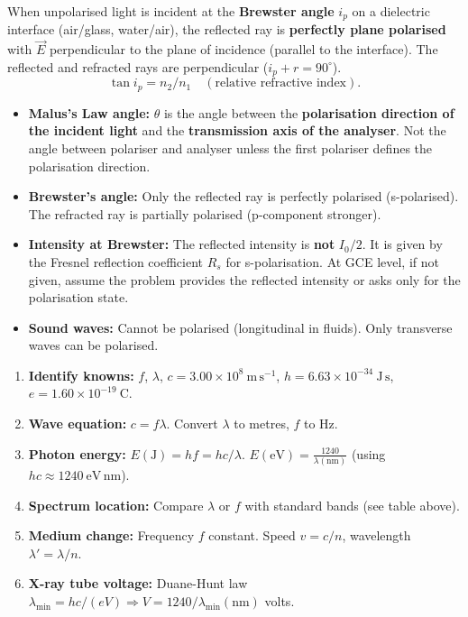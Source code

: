 \documentclass[11pt]{article}
\begin{document}
\begin{propriete}
When unpolarised light is incident at the \textbf{Brewster angle} $i_p$ on a dielectric interface (air/glass, water/air), the reflected ray is \textbf{perfectly plane polarised} with $\vec{E}$ perpendicular to the plane of incidence (parallel to the interface). The reflected and refracted rays are perpendicular ($i_p + r = 90^\circ$).
\[
\tan i_p = n_2/n_1 \quad (\text{relative refractive index}).
\]
\end{propriete}

\begin{attention}
\begin{itemize}
\item \textbf{Malus's Law angle:} $\theta$ is the angle between the \textbf{polarisation direction of the incident light} and the \textbf{transmission axis of the analyser}. Not the angle between polariser and analyser unless the first polariser defines the polarisation direction.
\item \textbf{Brewster's angle:} Only the reflected ray is perfectly polarised (s-polarised). The refracted ray is partially polarised (p-component stronger).
\item \textbf{Intensity at Brewster:} The reflected intensity is \textbf{not} $I_0/2$. It is given by the Fresnel reflection coefficient $R_s$ for s-polarisation. At GCE level, if not given, assume the problem provides the reflected intensity or asks only for the polarisation state.
\item \textbf{Sound waves:} Cannot be polarised (longitudinal in fluids). Only transverse waves can be polarised.
\end{itemize}
\end{attention}

\begin{methode}
\begin{enumerate}
\item \textbf{Identify knowns:} $f$, $\lambda$, $c = 3.00 \times 10^8\ \mathrm{m\,s^{-1}}$, $h = 6.63 \times 10^{-34}\ \mathrm{J\,s}$, $e = 1.60 \times 10^{-19}\ \mathrm{C}$.
\item \textbf{Wave equation:} $c = f\lambda$. Convert $\lambda$ to metres, $f$ to Hz.
\item \textbf{Photon energy:} $E(\mathrm{J}) = hf = hc/\lambda$. $E(\mathrm{eV}) = \frac{1240}{\lambda(\mathrm{nm})}$ (using $hc \approx 1240\ \mathrm{eV\,nm}$).
\item \textbf{Spectrum location:} Compare $\lambda$ or $f$ with standard bands (see table above).
\item \textbf{Medium change:} Frequency $f$ constant. Speed $v = c/n$, wavelength $\lambda' = \lambda/n$.
\item \textbf{X-ray tube voltage:} Duane-Hunt law $\lambda_{\min} = hc/(eV) \Rightarrow V = 1240/\lambda_{\min}(\mathrm{nm})$ volts.
\end{enumerate}
\end{methode}
\end{document}
